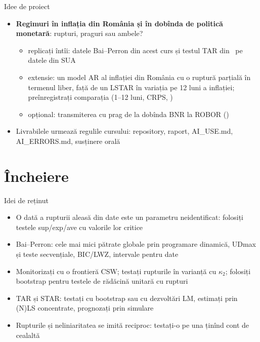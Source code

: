 \begin{frame}{Idee de proiect}
\itemsize{\small}
\begin{itemize}
    \item \textbf{Regimuri în inflația din România și în dobînda de politică monetară}: rupturi, praguri sau ambele?
    \begin{itemize}
        \item replicați întîi: datele Bai--Perron din acest curs și testul TAR din \ pe datele din SUA
        \item extensie: un model AR al inflației din România cu o ruptură parțială în termenul liber, față de un LSTAR în variația pe 12 luni a inflației; preînregistrați comparația (1--12 luni, CRPS, )
        \item opțional: transmiterea cu prag de la dobînda BNR la ROBOR ()
    \end{itemize}
    \item Livrabilele urmează regulile cursului: repository, raport, AI\_USE.md, AI\_ERRORS.md, susținere orală
\end{itemize}
\end{frame}


\section{Încheiere}

\begin{frame}{Idei de reținut}
\itemsize{\small}
\begin{itemize}
    \item O dată a rupturii aleasă din date este un parametru neidentificat: folosiți testele sup/exp/ave cu valorile lor critice
    \item Bai--Perron: cele mai mici pătrate globale prin programare dinamică, UDmax și teste secvențiale, BIC/LWZ, intervale pentru date
    \item Monitorizați cu o frontieră CSW; testați rupturile în varianță cu $\kappa_2$; folosiți bootstrap pentru testele de rădăcină unitară cu rupturi
    \item TAR și STAR: testați cu bootstrap sau cu dezvoltări LM, estimați prin (N)LS concentrate, prognozați prin simulare
    \item Rupturile și neliniaritatea se imită reciproc: testați-o pe una ținînd cont de cealaltă
\end{itemize}
\end{frame}


